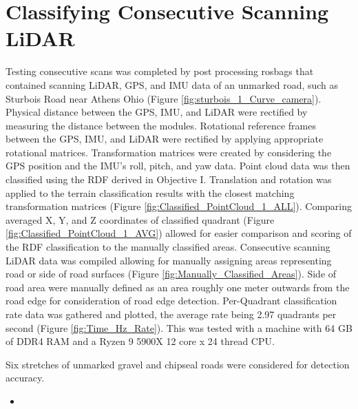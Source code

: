\documentclass[numbered,pdftex]{ohio-etd}
\begin{document}
{	\section{Classifying Consecutive Scanning LiDAR}
	
		{Testing consecutive scans was completed by post processing rosbags that contained scanning LiDAR, GPS, and IMU data of an unmarked road, such as Sturbois Road near Athens Ohio (Figure \ref{fig:sturbois_1_Curve_camera}). Physical distance between the GPS, IMU, and LiDAR were rectified by measuring the distance between the modules. Rotational reference frames between the GPS, IMU, and LiDAR were rectified by applying appropriate rotational matrices. Transformation matrices were created by considering the GPS position and the IMU's roll, pitch, and yaw data. Point cloud data was then classified using the RDF derived in Objective I. Translation and rotation was applied to the terrain classification results with the closest matching transformation matrices (Figure \ref{fig:Classified_PointCloud_1_ALL}). Comparing averaged X, Y, and Z coordinates of classified quadrant (Figure \ref{fig:Classified_PointCloud_1_AVG}) allowed for easier comparison and scoring of the RDF classification to the manually classified areas. Consecutive scanning LiDAR data was compiled allowing for manually assigning areas representing road or side of road surfaces (Figure \ref{fig:Manually_Classified_Areas}). Side of road area were manually defined as an area roughly one meter outwards from the road edge for consideration of road edge detection. Per-Quadrant classification rate data was gathered and plotted, the average rate being 2.97 quadrants per second (Figure \ref{fig:Time_Hz_Rate}). This was tested with a machine with 64 GB of DDR4 RAM and a Ryzen 9 5900X 12 core x 24 thread CPU.}
		
		{Six stretches of unmarked gravel and chipseal roads were considered for detection accuracy.}
		
		\begin{itemize}[itemindent=1px]
			\item 
		\end{itemize}
		
}
\end{document}
